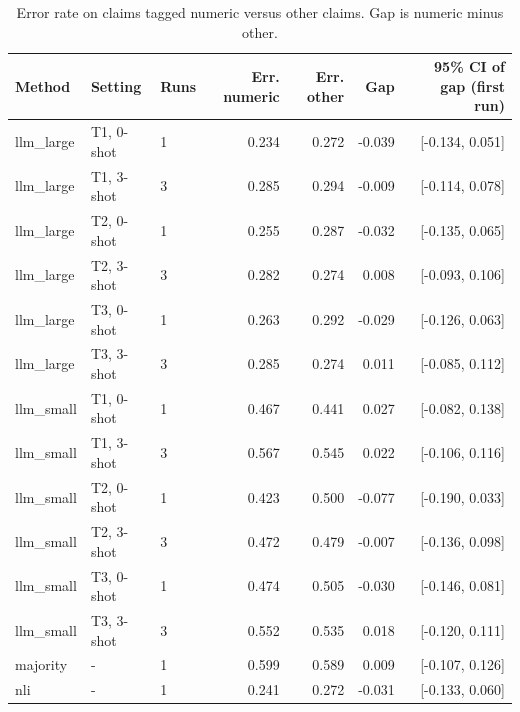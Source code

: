 \begin{table}[t]
\centering
\caption{Error rate on claims tagged numeric versus other claims. Gap is numeric minus other.}
\label{tab:numeric}
\begin{tabular}{lllrrrr}
\hline
Method & Setting & Runs & Err. numeric & Err. other & Gap & 95\% CI of gap (first run) \\
\hline
llm\_large & T1, 0-shot & 1 & 0.234 & 0.272 & -0.039 & [-0.134, 0.051] \\
llm\_large & T1, 3-shot & 3 & 0.285 & 0.294 & -0.009 & [-0.114, 0.078] \\
llm\_large & T2, 0-shot & 1 & 0.255 & 0.287 & -0.032 & [-0.135, 0.065] \\
llm\_large & T2, 3-shot & 3 & 0.282 & 0.274 & 0.008 & [-0.093, 0.106] \\
llm\_large & T3, 0-shot & 1 & 0.263 & 0.292 & -0.029 & [-0.126, 0.063] \\
llm\_large & T3, 3-shot & 3 & 0.285 & 0.274 & 0.011 & [-0.085, 0.112] \\
llm\_small & T1, 0-shot & 1 & 0.467 & 0.441 & 0.027 & [-0.082, 0.138] \\
llm\_small & T1, 3-shot & 3 & 0.567 & 0.545 & 0.022 & [-0.106, 0.116] \\
llm\_small & T2, 0-shot & 1 & 0.423 & 0.500 & -0.077 & [-0.190, 0.033] \\
llm\_small & T2, 3-shot & 3 & 0.472 & 0.479 & -0.007 & [-0.136, 0.098] \\
llm\_small & T3, 0-shot & 1 & 0.474 & 0.505 & -0.030 & [-0.146, 0.081] \\
llm\_small & T3, 3-shot & 3 & 0.552 & 0.535 & 0.018 & [-0.120, 0.111] \\
majority & - & 1 & 0.599 & 0.589 & 0.009 & [-0.107, 0.126] \\
nli & - & 1 & 0.241 & 0.272 & -0.031 & [-0.133, 0.060] \\
\hline
\end{tabular}
\end{table}